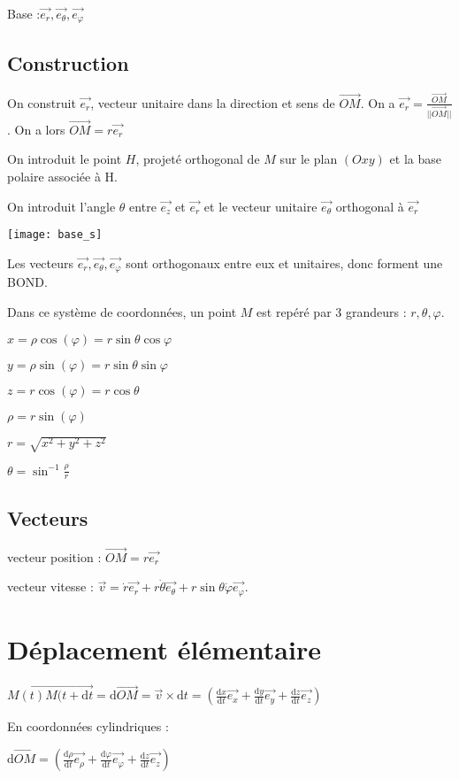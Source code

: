 \documentclass[french]{yLectureNote}
\renewcommand{\vec}{\overrightarrow}
\newcommand{\norm}[1]{||\vec{#1}||}
\begin{document}
Base :$\vec{e_r},\vec{e_{\theta}},\vec{e_{\varphi}}$
\subsection{Construction}
On construit $\vec{e_r}$, vecteur unitaire dans la direction et sens de $\vec{OM}$. On a $\vec{e_r} = \frac{\vec{OM}}{\norm{OM}}$. On a lors $\vec{OM} = r \vec{e_r}$

On introduit le point $H$, projeté orthogonal de $M$ sur le plan $(Oxy)$ et la base polaire associée à H.

On introduit l'angle $\theta$ entre $\vec{e_z}$ et $\vec{e_r}$ et le vecteur unitaire $\vec{e_{\theta}}$ orthogonal à $\vec{e_r}$

\texttt{[image: base\_s]}

Les vecteurs $\vec{e_r},\vec{e_{\theta}},\vec{e_{\varphi}}$ sont orthogonaux entre eux et unitaires, donc forment une BOND.

Dans ce système de coordonnées, un point $M$ est repéré par 3 grandeurs : $r,\theta,\varphi$.

$x= \rho \cos(\varphi) = r\sin\theta \cos\varphi$

$y = \rho \sin(\varphi) = r\sin\theta \sin\varphi$

$z = r \cos(\varphi) = r\cos\theta$

$ \rho = r\sin(\varphi)$

$r = \sqrt{x^2+y^2+z^2}$

$\theta = \sin^{-1} \frac{\rho}{r}$
\subsection{Vecteurs}
vecteur position : $\vec{OM} = r\vec{e_r}$

vecteur vitesse : $\vec{v} = \dot{r}\vec{e_r}+r\dot{\theta}\vec{e_{\theta}}+r\sin\theta \dot{\varphi}\vec{e_{\varphi}}$.
\section{Déplacement élémentaire}
$\vec{M(t)M(t+\mathrm{d}t} = \mathrm{d}\vec{OM} = \vec{v}\times \mathrm{d}t = (\frac{\mathrm{d}x}{\mathrm{d}t}\vec{e_x} + \frac{\mathrm{d}y}{\mathrm{d}t}\vec{e_y} + \frac{\mathrm{d}z}{\mathrm{d}t}\vec{e_z})$

En coordonnées cylindriques :

$\mathrm{d} \vec{OM} = (\frac{\mathrm{d}\rho}{\mathrm{d}t}\vec{e_{\rho}} + \frac{\mathrm{d}\varphi}{\mathrm{d}t}\vec{e_{\varphi}} + \frac{\mathrm{d}z}{\mathrm{d}t}\vec{e_z})$
\end{document}
